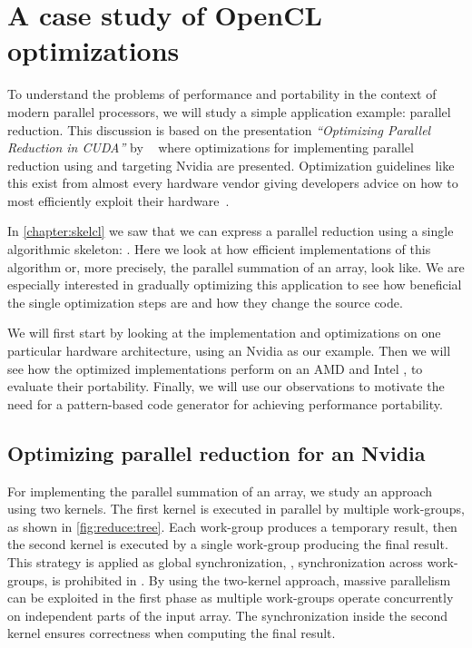 \section{A case study of OpenCL optimizations}
\label{sec:reduce:case-study}
\label{section:reduce:case-study}
To understand the problems of performance and portability in the context of modern parallel processors, we will study a simple application example: parallel reduction.
This discussion is based on the presentation \emph{``Optimizing Parallel Reduction in CUDA''} by \citeauthor{Harris2007}~\cite{Harris2007} where optimizations for implementing parallel reduction using \CUDA and targeting Nvidia \GPUs are presented.
Optimization guidelines like this exist from almost every hardware vendor giving developers advice on how to most efficiently exploit their hardware~\cite{CUDAProgrammingGuide,AMDProgrammingGuide,IntelGPUProgrammingGuide,IntelXeonProgrammingGuide}.

In \autoref{chapter:skelcl} we saw that we can express a parallel reduction using a single algorithmic skeleton: \reduce.
Here we look at how efficient \OpenCL implementations of this algorithm or, more precisely, the parallel summation of an array, look like.
We are especially interested in gradually optimizing this application to see how beneficial the single optimization steps are and how they change the source code.

We will first start by looking at the implementation and optimizations on one particular hardware architecture, using an Nvidia \GPU as our example.
Then we will see how the optimized implementations perform on an AMD \GPU and Intel \CPU, to evaluate their portability.
Finally, we will use our observations to motivate the need for a pattern-based code generator for achieving performance portability.


\subsection{Optimizing parallel reduction for an Nvidia \GPU}
For implementing the parallel summation of an array, we study an approach using two \OpenCL kernels.
The first \OpenCL kernel is executed in parallel by multiple \OpenCL work-groups, as shown in \autoref{fig:reduce:tree}.
Each work-group produces a temporary result, then the second \OpenCL kernel is executed by a single \OpenCL work-group producing the final result.
This strategy is applied as global synchronization, \ie, synchronization across work-groups, is prohibited in \OpenCL.
By using the two-kernel approach, massive parallelism can be exploited in the first phase as multiple work-groups operate concurrently on independent parts of the input array.
The synchronization inside the second kernel ensures correctness when computing the final result.

